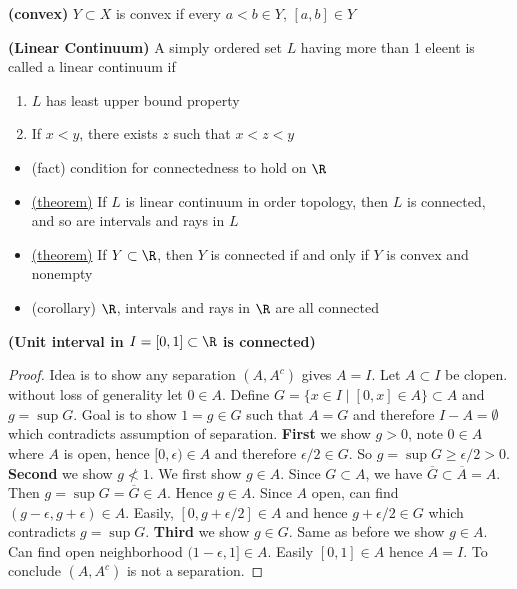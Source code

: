 \documentclass[10.5pt]{article}
\begin{document}
\begin{defn*}
    \textbf{(convex)} $Y\subset X$ is convex if every $a<b\in Y$, $[a,b] \in Y$
\end{defn*}

\begin{defn*}
    \textbf{(Linear Continuum)} A simply ordered set $L$ having more than 1 eleent is called a linear continuum if 
    \begin{enumerate}
        \item $L$ has least upper bound property
        \item If $x<y$, there exists $z$ such that $x<z<y$
    \end{enumerate}
    \begin{itemize}
        \item (fact) condition for connectedness to hold on $\R$
        \item \underline{(theorem)} If $L$ is linear continuum in order topology, then $L$ is connected, and so are intervals and rays in $L$
        \item \underline{(theorem)} If $Y\subset \R$, then $Y$ is connected if and only if $Y$ is convex and nonempty
        \item (corollary) $\R$, intervals and rays in $\R$ are all connected
    \end{itemize}
\end{defn*}

\begin{theorem*}
    \textbf{(Unit interval in $I=[0,1] \subset \R$ is connected)}
    \begin{proof}
        Idea is to show any separation $(A,A^c)$ gives $A = I$. Let $A \subset I$ be clopen. without loss of generality let $0\in A$. Define $G = \{x\in I \mid [0,x] \in A \}\subset A$ and $g = \sup G$. Goal is to show $1 = g \in G$ such that $A = G$ and therefore $I - A = \emptyset$ which contradicts assumption of separation. \textbf{First} we show $g>0$, note $0\in A$ where $A$ is open, hence $[0,\epsilon)\in A$ and therefore $\epsilon/2 \in G$. So $g=\sup G \geq \epsilon/2 > 0$. \textbf{Second} we show $g \not< 1$. We first show $g\in A$. Since $G\subset A$, we have $\overline{G} \subset \overline{A}=A$. Then $g = \sup G = \overline{G} \in A$. Hence $g\in A$. Since $A$ open, can find $(g-\epsilon, g+\epsilon)\in A$. Easily, $[0, g + \epsilon/2] \in A$ and hence $g+\epsilon/2 \in G$ which contradicts $g =\sup G$. \textbf{Third} we show $g\in G$. Same as before we show $g\in A$. Can find open neighborhood $(1-\epsilon, 1] \in A$. Easily $[0,1] \in A$ hence $A=I$. To conclude $(A,A^c)$ is not a separation. 
    \end{proof}
\end{theorem*}
\end{document}

